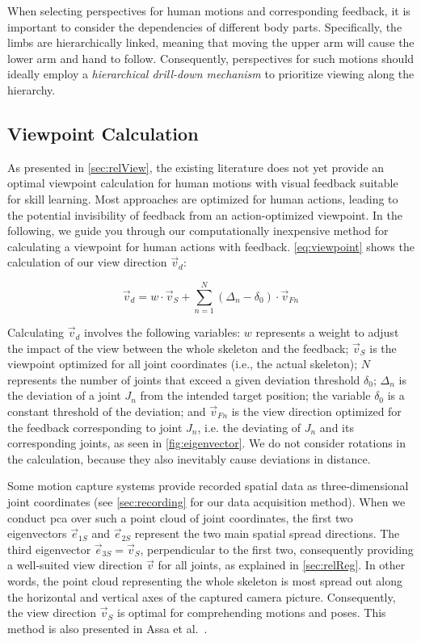 When selecting perspectives for human motions and corresponding feedback, it is important to consider the dependencies of different body parts. Specifically, the limbs are hierarchically linked, meaning that moving the upper arm will cause the lower arm and hand to follow. Consequently, perspectives for such motions should ideally employ a \emph{hierarchical drill-down mechanism} to prioritize viewing along the hierarchy.

\subsection*{Viewpoint Calculation \label{sec:methViewCalc}}

As presented in \autoref{sec:relView}, the existing literature does not yet provide an optimal viewpoint calculation for human motions with visual feedback suitable for skill learning. Most approaches are optimized for human actions, leading to the potential invisibility of feedback from an action-optimized viewpoint. In the following, we guide you through our computationally inexpensive method for calculating a viewpoint for human actions with feedback. \autoref{eq:viewpoint} shows the calculation of our view direction $\vec{v}_d$:

\begin{equation}
	\label{eq:viewpoint}
	\vec{v}_d = w \cdot \vec{v}_{S} + \sum_{n=1}^N (\Delta_n - \delta_0) \cdot \vec{v}_{Fn}
\end{equation}

Calculating $\vec{v}_d$ involves the following variables: \(w\) represents a weight to adjust the impact of the view between the whole skeleton and the feedback; \(\vec{v}_S\) is the viewpoint optimized for all joint coordinates (i.e., the actual skeleton); \(N\) represents the number of joints that exceed a given deviation threshold \(\delta_0\); \(\Delta_n\) is the deviation of a joint \(J_n\) from the intended target position; the variable \(\delta_0\) is a constant threshold of the deviation; and \(\vec{v}_{Fn}\) is the view direction optimized for the feedback corresponding to joint \(J_n\), i.e. the deviating of \(J_n\) and its corresponding joints, as seen in \autoref{fig:eigenvector}. We do not consider rotations in the calculation, because they also inevitably cause deviations in distance.

Some motion capture systems provide recorded spatial data as three-dimensional joint coordinates (see \autoref{sec:recording} for our data acquisition method). When we conduct \acrshort{pca} over such a point cloud of joint coordinates, the first two eigenvectors \(\vec{e}_{1S}\) and \(\vec{e}_{2S}\) represent the two main spatial spread directions. The third eigenvector \(\vec{e}_{3S} = \vec{v}_S\), perpendicular to the first two, consequently providing a well-suited view direction $\vec{v}$ for all joints, as explained in \autoref{sec:relReg}. In other words, the point cloud representing the whole skeleton is most spread out along the horizontal and vertical axes of the captured camera picture. Consequently, the view direction \(\vec{v}_S\) is optimal for comprehending motions and poses. This method is also presented in Assa et al.~\cite{assa2008moh}.


